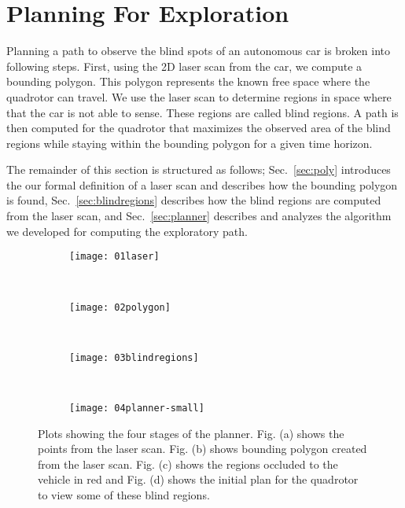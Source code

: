 
\section{Planning For Exploration}

Planning a path to observe the blind spots of an autonomous car is broken into
following steps. First, using the 2D laser scan from the car, we compute a
bounding polygon. This polygon represents the known free space where the
quadrotor can travel. We use the laser scan to determine regions in space where
that the car is not able to sense. These regions are called blind regions. A
path is then computed for the quadrotor that maximizes the observed area of the
blind regions while staying within the bounding polygon for a given time
horizon.

The remainder of this section is structured as follows; Sec.~\ref{sec:poly}
introduces the our formal definition of a laser scan and describes how the
bounding polygon is found, Sec.~\ref{sec:blindregions} describes how the blind
regions are computed from the laser scan, and Sec.~\ref{sec:planner} describes
and analyzes the algorithm we developed for computing the exploratory path.

\begin{figure}[ht]

    \centering

    \begin{subfigure}[t]{0.44\textwidth}
        \centering
        \texttt{[image: 01laser]}
        \caption{}
        \label{fig:01laser}
    \end{subfigure}
    ~
    \begin{subfigure}[t]{0.44\textwidth}
        \centering
        \texttt{[image: 02polygon]}
        \caption{}
        \label{fig:02polygon}
    \end{subfigure}
    ~
    \begin{subfigure}[t]{0.44\textwidth}
        \centering
        \texttt{[image: 03blindregions]}
        \caption{}
        \label{fig:03blindregions}
    \end{subfigure}
    ~
    \begin{subfigure}[t]{0.44\textwidth}
        \centering
        \texttt{[image: 04planner-small]}
        \caption{}
        \label{fig:04planner-small}
    \end{subfigure}

    \caption{Plots showing the four stages of the planner. Fig. (a) shows the
    points from the laser scan. Fig. (b) shows bounding polygon created from
the laser scan. Fig. (c) shows the regions occluded to the vehicle in red and
Fig. (d) shows the initial plan for the quadrotor to view some of these blind
regions.}

    \label{fig:planner-stages}

\end{figure}

